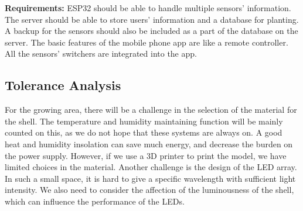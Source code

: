 \textbf{Requirements:}
ESP32 should be able to handle multiple sensors' information. The server should be able to store users' information and a database for planting. A backup for the sensors should also be included as a part of the database on the server. The basic features of the mobile phone app are like a remote controller. All the sensors' switchers are integrated into the app.

\subsection{Tolerance Analysis} 
For the growing area, there will be a challenge in the selection of the material for the shell. The temperature and humidity maintaining function will be mainly counted on this, as we do not hope that these systems are always on. A good heat and humidity insolation can save much energy, and decrease the burden on the power supply. However, if we use a 3D printer to print the model, we have limited choices in the material. 
Another challenge is the design of the LED array. In such a small space, it is hard to give a specific wavelength with sufficient light intensity. We also need to consider the affection of the luminousness of the shell, which can influence the performance of the LEDs.
